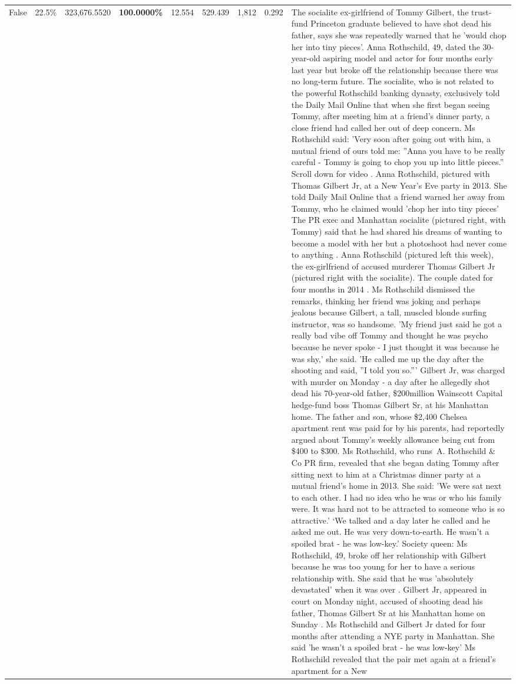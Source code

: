 \begin{table}[H]
\begin{tabular}{lllrlllll}
False & 22.5\% & 323,676.5520 & \bfseries \color{red} 100.0000\% & 12.554 & 529.439 & 1,812 & 0.292 & The socialite ex-girlfriend of Tommy Gilbert, the trust-fund Princeton graduate believed to have shot dead his father, says she was repeatedly warned that he 'would chop her into tiny pieces'. Anna Rothschild, 49, dated the 30-year-old aspiring model and actor for four months early last year but broke off the relationship because there was no long-term future. The socialite, who is not related to the powerful Rothschild banking dynasty, exclusively told the Daily Mail Online that when she first began seeing Tommy, after meeting him at a friend's dinner party, a close friend had called her out of deep concern. Ms Rothschild said: 'Very soon after going out with him, a mutual friend of ours told me: ''Anna you have to be really careful - Tommy is going to chop you up into little pieces.'' Scroll down for video . Anna Rothschild, pictured with Thomas Gilbert Jr, at a New Year's Eve party in 2013. She told Daily Mail Online that a friend warned her away from Tommy, who he claimed would 'chop her into tiny pieces' The PR exec and Manhattan socialite (pictured right, with Tommy) said that he had shared his dreams of wanting to become a model with her but a photoshoot had never come to anything . Anna Rothschild (pictured left this week), the ex-girlfriend of accused murderer Thomas Gilbert Jr (pictured right with the socialite). The couple dated for four months in 2014 . Ms Rothschild dismissed the remarks, thinking her friend was joking and perhaps jealous because Gilbert, a tall, muscled blonde surfing instructor, was so handsome. 'My friend just said he got a really bad vibe off Tommy and thought he was psycho because he never spoke - I just thought it was because he was shy,' she said. 'He called me up the day after the shooting and said, ''I told you so.''' Gilbert Jr, was charged with murder on Monday - a day after he allegedly shot dead his 70-year-old father, \$200million Wainscott Capital hedge-fund boss Thomas Gilbert Sr, at his Manhattan home. The father and son, whose \$2,400 Chelsea apartment rent was paid for by his parents, had reportedly argued about Tommy's weekly allowance being cut from \$400 to \$300. Ms Rothschild, who runs A. Rothschild \& Co PR firm, revealed that she began dating Tommy after sitting next to him at a Christmas dinner party at a mutual friend's home in 2013. She said: 'We were sat next to each other. I had no idea who he was or who his family were. It was hard not to be attracted to someone who is so attractive.' ‘We talked and a day later he called and he asked me out. He was very down-to-earth. He wasn’t a spoiled brat - he was low-key.’ Society queen: Ms Rothschild, 49, broke off her relationship with Gilbert because he was too young for her to have a serious relationship with. She said that he was 'absolutely devastated' when it was over . Gilbert Jr, appeared in court on Monday night, accused of shooting dead his father, Thomas Gilbert Sr at his Manhattan home on Sunday . Ms Rothschild and Gilbert Jr dated for four months after attending a NYE party in Manhattan. She said 'he wasn't a spoiled brat - he was low-key' Ms Rothschild revealed that the pair met again at a friend’s apartment for a New 
\end{tabular}
\end{table}
